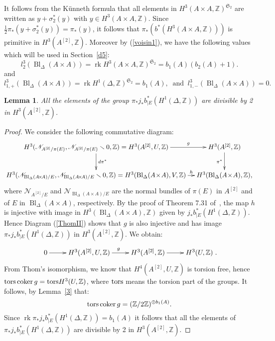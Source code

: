 \documentclass{alggeom}
\DeclareMathOperator{\rk}{rk}
\DeclareMathOperator{\coker}{coker}
\DeclareMathOperator{\Bl}{Bl}
\newcommand{\tors}{{\rm{tors}}}
\newcommand{\Z}{\mathbb{Z}}
\theoremstyle{plain}
\newtheorem{lemma}[theorem]{Lemma}
\theoremstyle{definition}
\theoremstyle{remark}
\begin{document}
It follows from the K\"unneth formula that
all elements in $H^{3}(A\times A,\Z)^{\mathfrak{S}_2}$ are written as $y+\sigma_{2}^{*}(y)$ with $y\in H^{3}(A\times A,\Z)$.
Since $\frac{1}{2}\pi_{*}(y+\sigma_{2}^{*}(y))=\pi_{*}(y)$, it follows that $\pi_{*}(b^*(H^{3}(A\times A,\Z)))$ is primitive in $H^{3}(A^{[2]},\Z)$.
Moreover by (\ref{voisin1}), we have the following values which will be used in Section~\ref{d5}:
$$l_2^3(\Bl_\Delta(A\! \times\! A))=\rk H^{3}(A\times A,\Z)^{\mathfrak{S}_2}=b_1(A)(b_2(A)+1).$$
and
\begin{equation}
l_{1,+}^3(\Bl_\Delta(A\! \times\! A))=\rk H^{1}(\Delta,\Z)^{\mathfrak{S}_2}=b_1(A),\ \text{ and }\ l_{1,-}^3(\Bl_\Delta(A\! \times\! A))=0.
\label{l1}
\end{equation}
\begin{lemma}\label{primitive3}
All the elements of the group $\pi_{*}j_*b_{|E}^{*}(H^{1}(\Delta,\Z))$ are divisible by 2 in $H^{3}(A^{[2]},\Z)$.
\end{lemma}
\begin{proof}
We consider the following commutative diagram:
\begin{equation}
\xymatrix@C=10pt{
\ar[d]^{d\pi^{*}} H^{3}(\mathscr{N}_{A^{[2]}/\pi(E)},\mathscr{N}_{A^{[2]}/\pi(E)}\smallsetminus0,\Z)=H^{3}(A^{[2]},U,\Z)
\ar[r]^-{g}&
H^{3}(A^{[2]},\Z)\ar[d]_{\pi^{*}} \\
H^{3}(\mathscr{N}_{\Bl_\Delta(A\! \times\! A)/E},\mathscr{N}_{\Bl_\Delta(A\! \times\! A)/E}\smallsetminus0,\Z)=H^{3}(\Bl_\Delta(A\! \times\! A),V,\Z)
\ar[r]^-{h}&H^{3}(\Bl_\Delta(A\! \times\! A),\Z),
}
\label{ThomII}
\end{equation}
where $\mathscr{N}_{A^{[2]}/E}$ and $\mathscr{N}_{\Bl_\Delta(A\! \times\! A)/E}$ are the normal bundles of $\pi(E)$ in $A^{[2]}$ and of $E$ in $\Bl_\Delta(A\! \times\! A)$, respectively.
By the proof of Theorem 7.31 of~\cite{Voisin}, the map $h$ is injective with image in $H^{3}(\Bl_\Delta(A\! \times\! A),\Z)$ given by $j_*b_{|E}^{*}(H^{1}(\Delta,\Z))$. Hence Diagram (\ref{ThomII}) shows that $g$ is also injective and has image $\pi_{*}j_*b_{|E}^{*}(H^{1}(\Delta,\Z))$ in $H^{3}(A^{[2]},\Z)$.
We obtain:
\begin{equation}
\xymatrix{ 0\ar[r]&H^{3}(A^{[2]},U,\Z)\ar[r]^g&H^{3}(A^{[2]},\Z)\ar[r]&H^{3}(U,\Z)}.
\label{exactutile}
\end{equation}
From Thom's isomorphism, we know that $H^{4}(A^{[2]},U,\Z)$ is torsion free, hence  $\tors \coker g= \tors H^{3}(U,\Z)$, 
where $\tors$ means the torsion part of the groups.
It follows,
by Lemma~\ref{3} that:
$$\tors \coker g=(\Z/2\Z)^{\oplus b_1(A)}.$$
Since $\rk\pi_{*}j_*b_{|E}^{*}(H^{1}(\Delta,\Z))=b_1(A)$ it follows that all the elements of $\pi_{*}j_*b_{|E}^{*}(H^{1}(\Delta,\Z))$ are divisible by 2 in $H^{3}(A^{[2]},\Z)$.
\end{proof}
\end{document}
